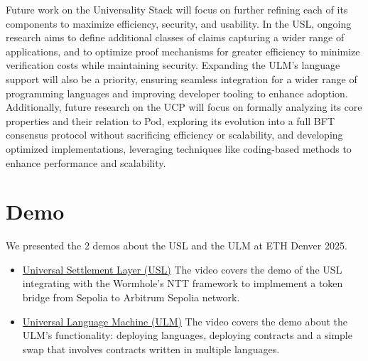 \documentclass{article}
\newcommand{\UC}{UCP}
\begin{document}
Future work on the Universality Stack will focus on further refining each of its components to maximize efficiency, security, and usability. In the USL, ongoing research aims to define additional classes of claims capturing a wider range of applications, and to optimize proof mechanisms for greater efficiency to minimize verification costs while maintaining security. Expanding the ULM’s language support will also be a priority, ensuring seamless integration for a wider range of programming languages and improving developer tooling to enhance adoption. Additionally, future research on the \UC{} will focus on formally analyzing its core properties and their relation to Pod, exploring its evolution into a full BFT consensus protocol without sacrificing efficiency or scalability, and developing optimized implementations, leveraging techniques like coding-based methods to enhance performance and scalability.


\section{Demo}
We presented the 2 demos about the USL and the ULM at ETH Denver 2025.
\begin{itemize}
   \item \href{https://pi2.network/videos/USL-Wormhole-Devcon-7}{Universal Settlement Layer (USL)} The video covers the demo of the USL integrating with the Wormhole's NTT framework to implmement a token bridge from Sepolia to Arbitrum Sepolia network.
  \item \href{https://pi2.network/videos/ULM-Devcon-7}{Universal Language Machine (ULM)} The video covers the demo about the ULM's functionality: deploying languages, deploying contracts and a simple swap that involves contracts written in multiple languages.
\end{itemize}



\end{document}
